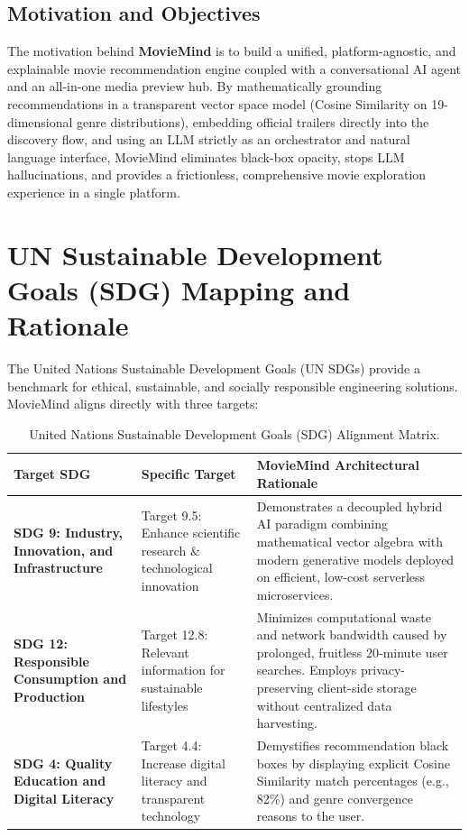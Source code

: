 \documentclass[11pt,a4paper]{article}
\begin{document}
\subsection{Motivation and Objectives}
The motivation behind \textbf{MovieMind} is to build a unified, platform-agnostic, and explainable movie recommendation engine coupled with a conversational AI agent and an all-in-one media preview hub. By mathematically grounding recommendations in a transparent vector space model (Cosine Similarity on 19-dimensional genre distributions), embedding official trailers directly into the discovery flow, and using an LLM strictly as an orchestrator and natural language interface, MovieMind eliminates black-box opacity, stops LLM hallucinations, and provides a frictionless, comprehensive movie exploration experience in a single platform.

\section{UN Sustainable Development Goals (SDG) Mapping and Rationale}

The United Nations Sustainable Development Goals (UN SDGs) provide a benchmark for ethical, sustainable, and socially responsible engineering solutions. MovieMind aligns directly with three targets:

\begin{table}[H]
\centering
\small
\begin{tabularx}{\textwidth}{p{4.2cm} p{3.6cm} X}
\toprule
\rowcolor{tableheader}
\textbf{Target SDG} & \textbf{Specific Target} & \textbf{MovieMind Architectural Rationale} \\
\midrule
\textbf{SDG 9: Industry, Innovation, and Infrastructure} & Target 9.5: Enhance scientific research \& technological innovation & Demonstrates a decoupled hybrid AI paradigm combining mathematical vector algebra with modern generative models deployed on efficient, low-cost serverless microservices. \\
\addlinespace
\textbf{SDG 12: Responsible Consumption and Production} & Target 12.8: Relevant information for sustainable lifestyles & Minimizes computational waste and network bandwidth caused by prolonged, fruitless 20-minute user searches. Employs privacy-preserving client-side storage without centralized data harvesting. \\
\addlinespace
\textbf{SDG 4: Quality Education and Digital Literacy} & Target 4.4: Increase digital literacy and transparent technology & Demystifies recommendation black boxes by displaying explicit Cosine Similarity match percentages (e.g., 82\%) and genre convergence reasons to the user. \\
\bottomrule
\end{tabularx}
\caption{United Nations Sustainable Development Goals (SDG) Alignment Matrix.}
\label{tab:sdg}
\end{table}
\end{document}
